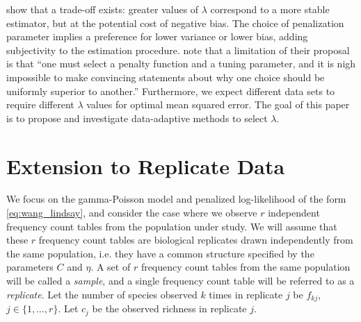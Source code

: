 \documentclass[12pt]{article}
\theoremstyle{break}
\theoremstyle{break}
\begin{document}
\citet{wang_2005} show that a trade-off exists: greater values of $\lambda$ correspond to a more stable estimator, but at the potential cost of negative bias.
The choice of penalization parameter implies a preference for lower variance or lower bias, adding subjectivity to the estimation procedure.
\citet{wang_2005} note that a limitation of their proposal is that ``one must select a penalty function and a tuning parameter, and it is nigh impossible to make convincing statements about why one choice should be uniformly superior to another.''
Furthermore, we expect different data sets to require different $\lambda$ values for optimal mean squared error.
The goal of this paper is to propose and investigate data-adaptive methods to select $\lambda$.


\section{Extension to Replicate Data}
\label{sec:fixed_lambda}

We focus on the gamma-Poisson model and penalized log-likelihood of the form \eqref{eq:wang_lindsay}, and consider the case where we observe $r$ independent frequency count tables from the population under study.
We will assume that these $r$ frequency count tables are biological replicates drawn independently from the same population, i.e. they have a common structure specified by the parameters $C$ and $\eta$.  A set of $r$ frequency count tables from the same population will be called a \textit{sample}, and a single frequency count table will be referred to as a \textit{replicate}.  Let the number of species observed $k$ times in replicate $j$ be $f_{kj}$, $j \in \{1, \dots , r\}$.  Let $c_j$ be the observed richness in replicate $j$.

\end{document}
